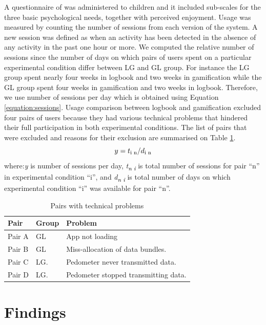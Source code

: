 \documentclass{sig-alternate}
\def\SB#1{\textsubscript{\textcolor{black}{#1}}}
\begin{document}
A questionnaire of was administered to children and it included sub-scales for the three basic psychological needs, together with perceived enjoyment.
Usage was measured by counting the number of sessions from each version of the system. A new session was defined as when an activity has been detected in the absence of any activity in the past one hour or more. We computed the relative number of sessions since the number of days on which pairs of users spent on a particular experimental condition differ between LG and GL group. For instance the LG group spent nearly four weeks in logbook and two weeks in gamification while the GL group spent four weeks in gamification and two weeks in logbook. Therefore, we use number of sessions per day which is obtained using Equation \ref{equation:sessions}. Usage comparison between logbook and gamification excluded four pairs of users because they had various technical problems that hindered their full participation in both experimental conditions. The list of pairs that were excluded and reasons for their exclusion are summarised on Table \ref{table:usageproblems}.
\begin{equation}
\label{equation:sessions}
y=t\SB{i n}/d\SB{i n}
\end{equation}
where:\emph{y} is number of sessions per day, \emph{t\SB{n i}} is total number of sessions for pair ``n'' in experimental condition ``i'', and \emph{d\SB{n i}} is total number of days on which experimental condition ``i'' was available for pair ``n''.
\begin{table}[h!]
  \begin{center}
    \caption{Pairs with technical problems}
    \label{table:usageproblems}
	\begin{tabular}{|p{0.95cm}|p{0.75cm}|p{5.4cm}|}
		\hline
		Pair&Group&Problem\\
		\hline
		Pair A&GL &App not loading\\
		\hline
		Pair B&GL& Miss-allocation of data bundles.\\
		\hline
		Pair C & LG.& Pedometer never transmitted data.\\
		\hline
		Pair D & LG.& Pedometer stopped transmitting data.\\
	\hline
	\end{tabular}
  \end{center}
\end{table}
\section{Findings}
\end{document}
